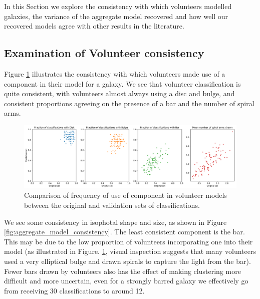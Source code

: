 \documentclass[../main.tex]{subfiles}
\begin{document}
\label{sec:results}

In this Section we explore the consistency with which volunteers modelled galaxies, the variance of the aggregate model recovered and how well our recovered models agree with other results in the literature.


\subsection{Examination of Volunteer consistency}
Figure \ref{fig:volunteer_component_consistency} illustrates the consistency with which volunteers made use of a component in their model for a galaxy. We see that volunteer classification is quite consistent, with volunteers almost always using a disc and bulge, and consistent proportions agreeing on the presence of a bar and the number of spiral arms.

\begin{figure}
  \includegraphics[width=17.3cm]{images__results/component_frequency.pdf}
  \caption{Comparison of frequency of use of component in volunteer models between the original and validation sets of classifications.}
  \label{fig:volunteer_component_consistency}
\end{figure}

We see some consistency in isophotal shape and size, as shown in Figure \ref{fig:aggregate_model_consistency}. The least consistent component is the bar. This may be due to the low proportion of volunteers incorporating one into their model (as illustrated in Figure. \ref{fig:volunteer_component_consistency}, visual inspection suggests that many volunteers used a very elliptical bulge and drawn spirals to capture the light from the bar). Fewer bars drawn by volunteers also has the effect of making clustering more difficult and more uncertain, even for a strongly barred galaxy we effectively go from receiving 30 classifications to around 12.
\end{document}
